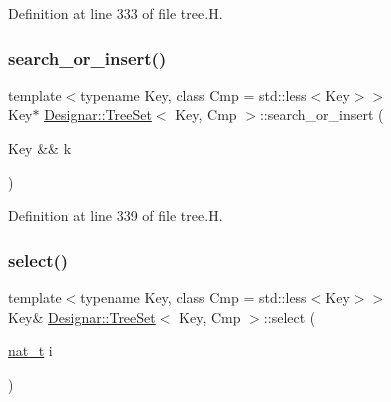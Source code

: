 Definition at line 333 of file tree.\+H.

\mbox{\label{class_designar_1_1_tree_set_a481f16723d8f1e3c2d351d93910a34cd}} 
\subsubsection{\texorpdfstring{search\+\_\+or\+\_\+insert()}{search\_or\_insert()}\hspace{0.1cm}{\footnotesize\ttfamily [2/2]}}
{\footnotesize\ttfamily template$<$typename Key, class Cmp = std\+::less$<$\+Key$>$$>$ \\
Key$\ast$ \hyperlink{class_designar_1_1_tree_set}{Designar\+::\+Tree\+Set}$<$ Key, Cmp $>$\+::search\+\_\+or\+\_\+insert (\begin{DoxyParamCaption}\item[{Key \&\&}]{k }\end{DoxyParamCaption})\hspace{0.3cm}{\ttfamily [inline]}}



Definition at line 339 of file tree.\+H.

\mbox{\label{class_designar_1_1_tree_set_a1592ef402d18c3e8664c56d9554ae993}} 
\subsubsection{\texorpdfstring{select()}{select()}\hspace{0.1cm}{\footnotesize\ttfamily [1/2]}}
{\footnotesize\ttfamily template$<$typename Key, class Cmp = std\+::less$<$\+Key$>$$>$ \\
Key\& \hyperlink{class_designar_1_1_tree_set}{Designar\+::\+Tree\+Set}$<$ Key, Cmp $>$\+::select (\begin{DoxyParamCaption}\item[{\hyperlink{namespace_designar_aa72662848b9f4815e7bf31a7cf3e33d1}{nat\+\_\+t}}]{i }\end{DoxyParamCaption})\hspace{0.3cm}{\ttfamily [inline]}}



